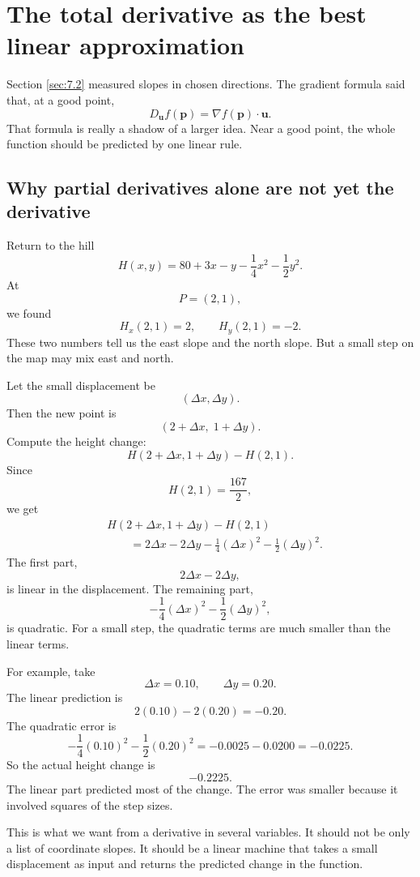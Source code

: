 \section{The total derivative as the best linear approximation}
\label{sec:7.3}

Section \ref{sec:7.2} measured slopes in chosen directions.  The gradient formula said
that, at a good point,
\[
    D_{\mathbf u}f(\mathbf p)=\nabla f(\mathbf p)\cdot \mathbf u.
\]
That formula is really a shadow of a larger idea.  Near a good point, the whole function
should be predicted by one linear rule.

\subsection{Why partial derivatives alone are not yet the derivative}

Return to the hill
\[
    H(x,y)=80+3x-y-\frac14x^2-\frac12y^2.
\]
At
\[
    P=(2,1),
\]
we found
\[
    H_x(2,1)=2,
    \qquad
    H_y(2,1)=-2.
\]
These two numbers tell us the east slope and the north slope.  But a small step on the
map may mix east and north.

Let the small displacement be
\[
    (\Delta x,\Delta y).
\]
Then the new point is
\[
    (2+\Delta x,\;1+\Delta y).
\]
Compute the height change:
\[
    H(2+\Delta x,1+\Delta y)-H(2,1).
\]
Since
\[
    H(2,1)=\frac{167}{2},
\]
we get
\[
\begin{aligned}
&H(2+\Delta x,1+\Delta y)-H(2,1)\\
&\qquad =
2\Delta x-2\Delta y
-\frac14(\Delta x)^2-\frac12(\Delta y)^2.
\end{aligned}
\]
The first part,
\[
    2\Delta x-2\Delta y,
\]
is linear in the displacement.  The remaining part,
\[
    -\frac14(\Delta x)^2-\frac12(\Delta y)^2,
\]
is quadratic.  For a small step, the quadratic terms are much smaller than the linear
terms.

For example, take
\[
    \Delta x=0.10,
    \qquad
    \Delta y=0.20.
\]
The linear prediction is
\[
    2(0.10)-2(0.20)=-0.20.
\]
The quadratic error is
\[
    -\frac14(0.10)^2-\frac12(0.20)^2
    =
    -0.0025-0.0200
    =
    -0.0225.
\]
So the actual height change is
\[
    -0.2225.
\]
The linear part predicted most of the change.  The error was smaller because it involved
squares of the step sizes.

This is what we want from a derivative in several variables.  It should not be only a
list of coordinate slopes.  It should be a linear machine that takes a small displacement
as input and returns the predicted change in the function.

